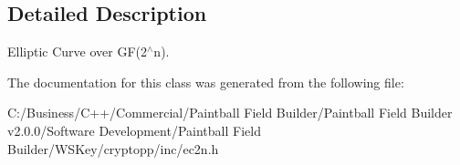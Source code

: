 \subsection{Detailed Description}
Elliptic Curve over GF(2$^\wedge$n). 

The documentation for this class was generated from the following file:\begin{DoxyCompactItemize}
\item 
C:/Business/C++/Commercial/Paintball Field Builder/Paintball Field Builder v2.0.0/Software Development/Paintball Field Builder/WSKey/cryptopp/inc/ec2n.h\end{DoxyCompactItemize}
